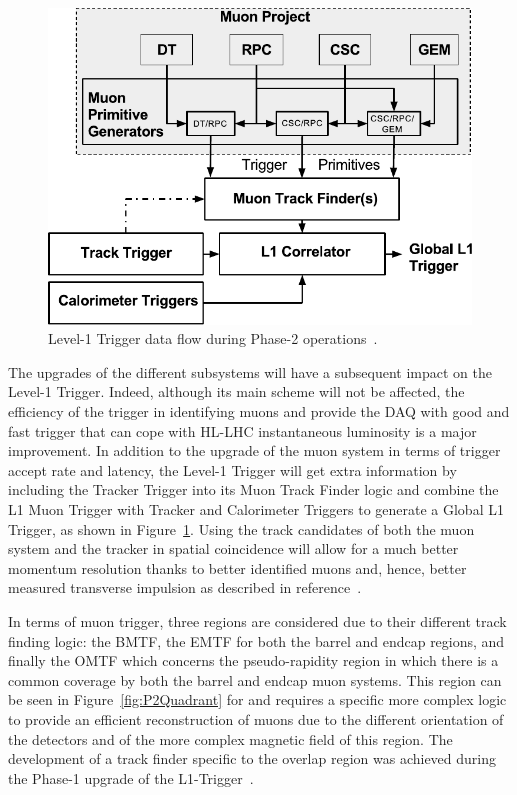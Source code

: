 \begingroup\setlength{\intextsep}{5pt}\setlength{\columnsep}{15pt}

	\begin{figure}
		\centering
		\includegraphics[width=\linewidth]{fig/chapt3/Phase-II-L1-Trigger.pdf}
		\caption{\label{fig:L1-trigger} Level-1 Trigger data flow during Phase-2 operations~\cite{PHASEIITP}.}
	\end{figure}

	The upgrades of the different subsystems will have a subsequent impact on the Level-1 Trigger. Indeed, although its main scheme will not be affected, the efficiency of the trigger in identifying muons and provide the DAQ with good and fast trigger that can cope with HL-LHC instantaneous luminosity is a major improvement. In addition to the upgrade of the muon system in terms of trigger accept rate and latency, the Level-1 Trigger will get extra information by including the Tracker Trigger into its Muon Track Finder logic and combine the L1 Muon Trigger with Tracker and Calorimeter Triggers to generate a Global L1 Trigger, as shown in Figure~\ref{fig:L1-trigger}. Using the track candidates of both the muon system and the tracker in spatial coincidence will allow for a much better momentum resolution thanks to better identified muons and, hence, better measured transverse impulsion as described in reference~\cite{PHASEIITP}.
	
\endgroup
	
	In terms of muon trigger, three regions are considered due to their different track finding logic: the \acf{BMTF}, the \acf{EMTF} for both the barrel and endcap regions, and finally the \acf{OMTF} which concerns the pseudo-rapidity region in which there is a common coverage by both the barrel and endcap muon systems. This region can be seen in Figure~\ref{fig:P2Quadrant} for  and requires a specific more complex logic to provide an efficient reconstruction of muons due to the different orientation of the detectors and of the more complex magnetic field of this region. The development of a track finder specific to the overlap region was achieved during the Phase-1 upgrade of the L1-Trigger~\cite{L1UPGRADE2016}.
	
